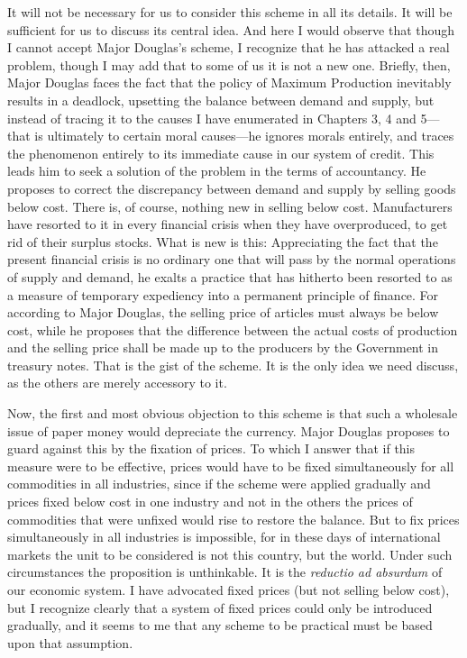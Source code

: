 \documentclass{book}
\begin{document}
It will not be necessary for us to consider this scheme in all its details. It will be sufficient for us to discuss its central idea. And here I would observe that though I cannot accept Major Douglas’s scheme, I recognize that he has attacked a real problem, though I may add that to some of us it is not a new one. Briefly, then, Major Douglas faces the fact that the policy of Maximum Production inevitably results in a deadlock, upsetting the balance between demand and supply, but instead of tracing it to the causes I have enumerated in Chapters 3, 4 and 5—that is ultimately to certain moral causes—he ignores morals entirely, and traces the phenomenon entirely to its immediate cause in our system of credit. This leads him to seek a solution of the problem in the terms of accountancy. He proposes to correct the discrepancy between demand and supply by selling goods below cost. There is, of course, nothing new in selling below cost. Manufacturers have resorted to it in every financial crisis when they have overproduced, to get rid of their surplus stocks. What is new is this: Appreciating the fact that the present financial crisis is no ordinary one that will pass by the normal operations of supply and demand, he exalts a practice that has hitherto been resorted to as a measure of temporary expediency into a permanent principle of finance. For according to Major Douglas, the selling price of articles must always be below cost, while he proposes that the difference between the actual costs of production and the selling price shall be made up to the producers by the Government in treasury notes. That is the gist of the scheme. It is the only idea we need discuss, as the others are merely accessory to it.

Now, the first and most obvious objection to this scheme is that such a wholesale issue of paper money would depreciate the currency. Major Douglas proposes to guard against this by the fixation of prices. To which I answer that if this measure were to be effective, prices would have to be fixed simultaneously for all commodities in all industries, since if the scheme were applied gradually and prices fixed below cost in one industry and not in the others the prices of commodities that were unfixed would rise to restore the balance. But to fix prices simultaneously in all industries is impossible, for in these days of international markets the unit to be considered is not this country, but the world. Under such circumstances the proposition is unthinkable. It is the \emph{reductio ad absurdum} of our economic system. I have advocated fixed prices (but not selling below cost), but I recognize clearly that a system of fixed prices could only be introduced gradually, and it seems to me that any scheme to be practical must be based upon that assumption.
\end{document}
